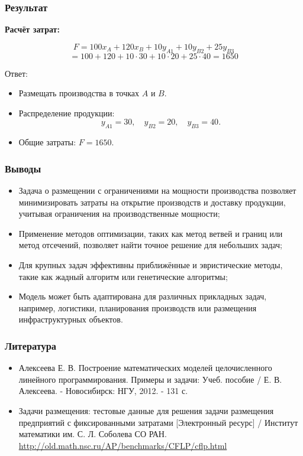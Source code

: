 \documentclass[12pt]{beamer}
\begin{document}
    \begin{frame}
        \frametitle{Результат}
    
        \textbf{Расчёт затрат:}

        $$F = 100x_A + 120x_B + 10y_{A1} + 10y_{B2} + 25y_{B3}$$
        $$= 100 + 120 + 10 \cdot 30 + 10 \cdot 20 + 25 \cdot 40 = 1650$$

        \begin{block}{Ответ:}
            \begin{itemize}
                \item Размещать производства в точках \( A \) и \( B \).
                \item Распределение продукции:
                \[
                y_{A1} = 30, \quad y_{B2} = 20, \quad y_{B3} = 40.
                \]
                \item Общие затраты: \( F = 1650 \).
            \end{itemize}    
        \end{block}

    \end{frame}

    \begin{frame}
        \frametitle{Выводы}
    
        \begin{itemize}
            \item Задача о размещении с ограничениями на мощности производства позволяет минимизировать затраты на открытие производств и доставку продукции, учитывая ограничения на производственные мощности;
            \item Применение методов оптимизации, таких как метод ветвей и границ или метод отсечений, позволяет найти точное решение для небольших задач;
            \item Для крупных задач эффективны приближённые и эвристические методы, такие как жадный алгоритм или генетические алгоритмы;
            \item Модель может быть адаптирована для различных прикладных задач, например, логистики, планирования производств или размещения инфраструктурных объектов.
        \end{itemize}
    
    \end{frame}

    \begin{frame}
        \frametitle{Литература}

        \begin{itemize}
            \item Алексеева Е. В. Построение математических моделей целочисленного линейного программирования. Примеры и задачи: Учеб. пособие / Е. В. Алексеева. - Новосибирск: НГУ, 2012. - 131 с.
            \item Задачи размещения: тестовые данные для решения задачи размещения предприятий с фиксированными затратами [Электронный ресурс] / Институт математики им. С. Л. Соболева СО РАН. \url{http://old.math.nsc.ru/AP/benchmarks/CFLP/cflp.html}
        \end{itemize}

    \end{frame}
	
\end{document}
